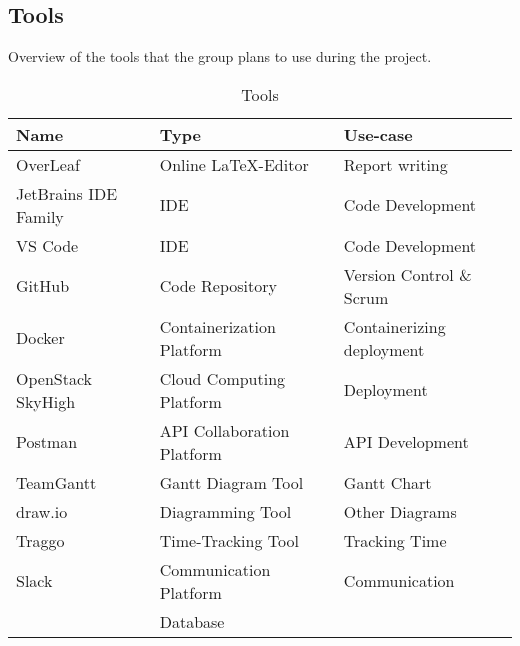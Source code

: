 \subsection{Tools}\label{sec:tools}
Overview of the tools that the group plans to use during the project.
\begin{table} [H]
    \centering
    \begin{tabular}{|l|l|l|}
    \hline
    Name & Type & Use-case \\
    \hline
    OverLeaf & Online \LaTeX-Editor & Report writing \\
    JetBrains IDE Family & IDE & Code Development \\
    VS Code & IDE & Code Development \\
    GitHub & Code Repository & Version Control \& Scrum \\
    Docker & Containerization Platform & Containerizing deployment \\
    OpenStack SkyHigh & Cloud Computing Platform & Deployment \\
    Postman & API Collaboration Platform & API Development \\
    TeamGantt & Gantt Diagram Tool & Gantt Chart \\
    draw.io & Diagramming Tool & Other Diagrams \\
    Traggo & Time-Tracking Tool & Tracking Time \\
    Slack & Communication Platform & Communication \\
     & Database & \\
    \hline
    \end{tabular}
    \caption{Tools}
    \label{tab:tools}
\end{table}

